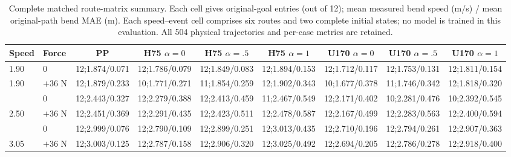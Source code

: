 \begin{table}[t]
\centering\scriptsize\setlength{\tabcolsep}{4pt}
\caption{Complete matched route-matrix summary. Each cell gives original-goal entries (out of 12); mean measured bend speed (m/s) / mean original-path bend MAE (m). Each speed--event cell comprises six routes and two complete initial states; no model is trained in this evaluation. All 504 physical trajectories and per-case metrics are retained.}
\label{tab:matrix}
\begin{tabular}{@{}llccccccc@{}}
\toprule
Speed & Force & PP & H75 $\alpha=0$ & H75 $\alpha=.5$ & H75 $\alpha=1$ & U170 $\alpha=0$ & U170 $\alpha=.5$ & U170 $\alpha=1$\\
\midrule
1.90 & 0 & 12;1.874/0.071 & 12;1.786/0.079 & 12;1.849/0.083 & 12;1.894/0.153 & 12;1.712/0.117 & 12;1.753/0.131 & 12;1.811/0.154\\
1.90 & $+36$ N & 12;1.879/0.233 & 10;1.771/0.271 & 11;1.854/0.259 & 12;1.902/0.343 & 10;1.677/0.378 & 11;1.746/0.342 & 12;1.818/0.320\\
\addlinespace[2pt]
2.50 & 0 & 12;2.443/0.327 & 12;2.279/0.388 & 12;2.413/0.459 & 11;2.467/0.549 & 12;2.171/0.402 & 10;2.281/0.476 & 10;2.392/0.545\\
2.50 & $+36$ N & 12;2.451/0.369 & 12;2.291/0.435 & 12;2.423/0.511 & 12;2.478/0.587 & 12;2.167/0.499 & 12;2.283/0.563 & 12;2.400/0.594\\
\addlinespace[2pt]
3.05 & 0 & 12;2.999/0.076 & 12;2.790/0.109 & 12;2.899/0.251 & 12;3.013/0.435 & 12;2.710/0.196 & 12;2.794/0.261 & 12;2.907/0.363\\
3.05 & $+36$ N & 12;3.003/0.125 & 12;2.787/0.158 & 12;2.906/0.320 & 12;3.025/0.492 & 12;2.694/0.205 & 12;2.786/0.278 & 12;2.918/0.400\\
\bottomrule
\end{tabular}
\end{table}
